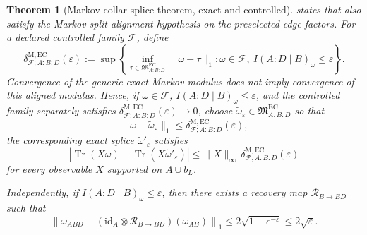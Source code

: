 \documentclass[11pt]{article}
\newtheorem{theorem}{Theorem}[section]
\theoremstyle{remark}
\theoremstyle{plain}
\begin{document}
\begin{theorem}[Markov-collar splice theorem, exact and controlled]
states that also satisfy the Markov-split alignment hypothesis on the
preselected edge factors. For a declared controlled family \(\mathcal F\), define
\[
\delta^{\mathrm{M,EC}}_{\mathcal F;A:B:D}(\varepsilon)
:=
\sup\left\{
\inf_{\tau\in\mathfrak M^{\mathrm{EC}}_{A:B:D}}\|\omega-\tau\|_1:
\omega\in\mathcal F,\ I(A:D\mid B)_\omega\le\varepsilon
\right\}.
\]
Convergence of the generic exact-Markov modulus does not imply convergence of
this aligned modulus. Hence, if \(\omega\in\mathcal F\),
\(I(A:D\mid B)_\omega\le \varepsilon\), and the controlled family separately
satisfies \(\delta^{\mathrm{M,EC}}_{\mathcal F;A:B:D}(\varepsilon)\to0\), choose
\(\widetilde\omega_\varepsilon\in\mathfrak M^{\mathrm{EC}}_{A:B:D}\) so that
\[
\|\omega-\widetilde\omega_\varepsilon\|_1
\le
\delta^{\mathrm{M,EC}}_{\mathcal F;A:B:D}(\varepsilon),
\]
the corresponding exact splice \(\widetilde\omega'_\varepsilon\) satisfies
\[
\left|
\operatorname{Tr}(X\omega)-\operatorname{Tr}(X\widetilde\omega'_\varepsilon)
\right|
\le
\|X\|_\infty\,
\delta^{\mathrm{M,EC}}_{\mathcal F;A:B:D}(\varepsilon)
\]
for every observable \(X\) supported on \(A\cup b_L\).

Independently, if \(I(A:D\mid B)_\omega\le \varepsilon\), then there exists a recovery map \(\mathcal R_{B\to BD}\) such that
\[
\left\|
\omega_{ABD}
-
(\mathrm{id}_A\otimes \mathcal R_{B\to BD})(\omega_{AB})
\right\|_1
\le
2\sqrt{1-e^{-\varepsilon}}
\le
2\sqrt{\varepsilon}.
\]
\end{theorem}
\end{document}
